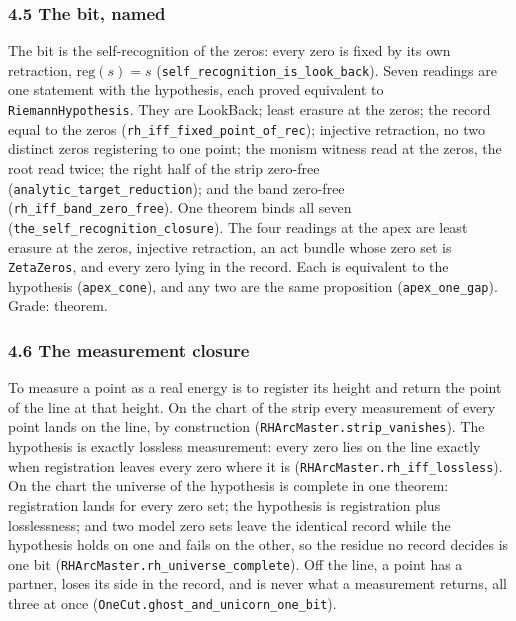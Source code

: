 \documentclass[10pt]{article}
\begin{document}
\hypertarget{the-bit-named}{%
\subsubsection{4.5 The bit, named}\label{the-bit-named}}

The bit is the self-recognition of the zeros: every zero is fixed by its
own retraction, \(\mathrm{reg}(s) = s\)
(\texttt{self\_\allowbreak{}recognition\_\allowbreak{}is\_\allowbreak{}look\_\allowbreak{}back}).
Seven readings are one statement with the hypothesis, each proved
equivalent to \texttt{RiemannHypothesis}. They are LookBack; least
erasure at the zeros; the record equal to the zeros
(\texttt{rh\_\allowbreak{}iff\_\allowbreak{}fixed\_\allowbreak{}point\_\allowbreak{}of\_\allowbreak{}rec});
injective retraction, no two distinct zeros registering to one point;
the monism witness read at the zeros, the root read twice; the right
half of the strip zero-free
(\texttt{analytic\_\allowbreak{}target\_\allowbreak{}reduction}); and
the band zero-free
(\texttt{rh\_\allowbreak{}iff\_\allowbreak{}band\_\allowbreak{}zero\_\allowbreak{}free}).
One theorem binds all seven
(\texttt{the\_\allowbreak{}self\_\allowbreak{}recognition\_\allowbreak{}closure}).
The four readings at the apex are least erasure at the zeros, injective
retraction, an act bundle whose zero set is \texttt{ZetaZeros}, and
every zero lying in the record. Each is equivalent to the hypothesis
(\texttt{apex\_\allowbreak{}cone}), and any two are the same proposition
(\texttt{apex\_\allowbreak{}one\_\allowbreak{}gap}). Grade: theorem.

\hypertarget{the-measurement-closure}{%
\subsubsection{4.6 The measurement
closure}\label{the-measurement-closure}}

To measure a point as a real energy is to register its height and return
the point of the line at that height. On the chart of the strip every
measurement of every point lands on the line, by construction
(\texttt{RHArcMaster.\allowbreak{}strip\_\allowbreak{}vanishes}). The
hypothesis is exactly lossless measurement: every zero lies on the line
exactly when registration leaves every zero where it is
(\texttt{RHArcMaster.\allowbreak{}rh\_\allowbreak{}iff\_\allowbreak{}lossless}).
On the chart the universe of the hypothesis is complete in one theorem:
registration lands for every zero set; the hypothesis is registration
plus losslessness; and two model zero sets leave the identical record
while the hypothesis holds on one and fails on the other, so the residue
no record decides is one bit
(\texttt{RHArcMaster.\allowbreak{}rh\_\allowbreak{}universe\_\allowbreak{}complete}).
Off the line, a point has a partner, loses its side in the record, and
is never what a measurement returns, all three at once
(\texttt{OneCut.\allowbreak{}ghost\_\allowbreak{}and\_\allowbreak{}unicorn\_\allowbreak{}one\_\allowbreak{}bit}).
\end{document}
